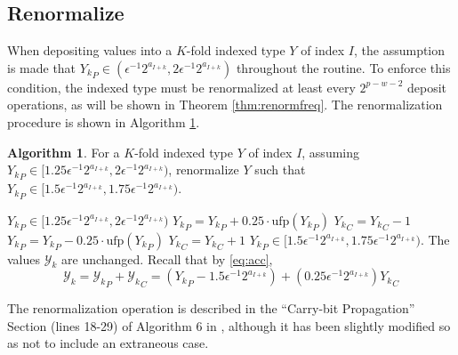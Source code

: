 \documentclass[12pt]{article}
\providecommand{\ufp}{\ensuremath{\text{ufp}}}
\providecommand{\To}{\ensuremath{\text{ to }}}
\theoremstyle{definition}
\newtheorem{alg}{Algorithm}[section]
\numberwithin{equation}{section}
\numberwithin{figure}{section}
\begin{document}
  \subsection{Renormalize}
    \label{sec:primitiveops_renormalize}
    When depositing values into a $K$-fold indexed type $Y$ of index $I$, the assumption is made that ${Y_k}_P \in (\epsilon^{-1} 2^{a_{I + k}}, 2  \epsilon^{-1} 2^{a_{I + k}})$ throughout the routine. To enforce this condition, the indexed type must be renormalized at least every $2^{p - w - 2}$ deposit operations, as will be shown in Theorem \ref{thm:renormfreq}. The renormalization procedure is shown in Algorithm \ref{alg:renorm}.

    \begin{samepage}
    \begin{alg}
      For a $K$-fold indexed type $Y$ of index $I$, assuming ${Y_k}_P \in [1.25  \epsilon^{-1} 2^{a_{I + k}}, 2  \epsilon^{-1} 2^{a_{I + k}})$, renormalize $Y$ such that ${Y_k}_P \in [1.5  \epsilon^{-1} 2^{a_{I + k}}, 1.75  \epsilon^{-1} 2^{a_{I + k}})$.
      \begin{algorithmic}[1]
        \Require
          \Statex ${Y_k}_P \in [1.25  \epsilon^{-1} 2^{a_{I + k}}, 2  \epsilon^{-1} 2^{a_{I + k}})$
          \For{$k = 0 \To K - 1$}
            \If{${Y_k}_P < 1.5 \cdot \ufp({Y_k}_P)$}
              \State ${Y_k}_P = {Y_k}_P + 0.25 \cdot \ufp({Y_k}_P)$
              \State ${Y_k}_C = {Y_k}_C - 1$
            \EndIf
            \If{${Y_k}_P \geq 1.75 \cdot \ufp({Y_k}_P)$}
              \State ${Y_k}_P = {Y_k}_P - 0.25 \cdot \ufp({Y_k}_P)$
              \State ${Y_k}_C = {Y_k}_C + 1$
            \EndIf
          \EndFor
        \EndFunction
        \Ensure
          \Statex ${Y_k}_P \in [1.5  \epsilon^{-1} 2^{a_{I + k}}, 1.75  \epsilon^{-1} 2^{a_{I + k}})$.
          \Statex The values $\mathcal{Y}_k$ are unchanged. Recall that by \eqref{eq:acc},
          \begin{equation*}
            \mathcal{Y}_k = {\mathcal{Y}_k}_P + {\mathcal{Y}_k}_C = ({Y_k}_P - 1.5 \epsilon^{-1} 2^{a_{I + k}}) + (0.25\epsilon^{-1}2^{a_{I + k}}){Y_k}_C
          \end{equation*}
      \end{algorithmic}
      \label{alg:renorm}
    \end{alg}
    \end{samepage}
    The renormalization operation is described in the ``Carry-bit Propagation'' Section (lines 18-29) of Algorithm $6$ in \cite{repsum}, although it has been slightly modified so as not to include an extraneous case.
\end{document}
